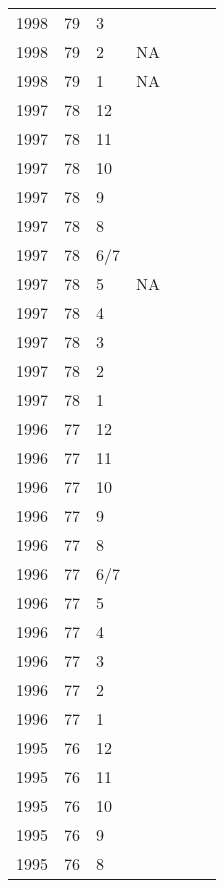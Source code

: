 \begin{longtable}{ |l|l|l|l|p{2.7cm}|l|p{2cm}| }
 1998 & 79 &     3 &         &  &  & \\
 1998 & 79 &     2 &     NA  &  &  & \\
 1998 & 79 &     1 &     NA  &  &  & \\
 1997 & 78 &    12 &         &  &  & \\
 1997 & 78 &    11 &         &  &  & \\
 1997 & 78 &    10 &         &  &  & \\
 1997 & 78 &     9 &         &  &  & \\
 1997 & 78 &     8 &         &  &  & \\
 1997 & 78 &   6/7 &         &  &  & \\
 1997 & 78 &     5 &     NA  &  &  & \\
 1997 & 78 &     4 &         &  &  & \\
 1997 & 78 &     3 &         &  &  & \\
 1997 & 78 &     2 &         &  &  & \\
 1997 & 78 &     1 &         &                &  & \\
 1996 & 77 &    12 &         &                &  & \\
 1996 & 77 &    11 &         &                &  & \\
 1996 & 77 &    10 &         &                &  & \\
 1996 & 77 &     9 &         &                &  & \\
 1996 & 77 &     8 &         &                &  & \\
 1996 & 77 &   6/7 &         &                &  & \\
 1996 & 77 &     5 &         &                &  & \\
 1996 & 77 &     4 &         &                &  & \\
 1996 & 77 &     3 &         &                &  & \\
 1996 & 77 &     2 &         &                &  & \\
 1996 & 77 &     1 &         &                &  & \\
 1995 & 76 &    12 &         &                &  & \\
 1995 & 76 &    11 &         &                &  & \\
 1995 & 76 &    10 &         &                &  & \\
 1995 & 76 &     9 &         &                &  & \\
 1995 & 76 &     8 &         &                &  & \\

\end{longtable}
